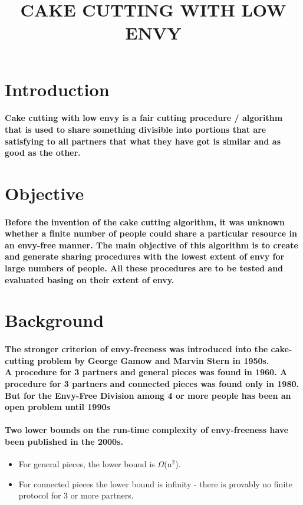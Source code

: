 \documentclass[12pt]{report}
\title{\textbf{CAKE CUTTING WITH LOW ENVY}}
\author{}
\begin{document}
\maketitle

	\section{Introduction} 
	\paragraph{Cake cutting with low envy is a fair cutting procedure / algorithm that is used to share something divisible into portions that are satisfying to all partners that what they have got is similar and as good as the other. }
	
		\section{Objective}
		\paragraph{Before the invention of the cake cutting algorithm, it was unknown whether a finite number of people could share a particular resource in an envy-free manner. The main objective of this algorithm is to create and generate sharing procedures with the lowest extent of envy for large numbers of people. All these procedures are to be tested and evaluated basing on their extent of envy.  }
		
	\section{Background}
	\paragraph{The stronger criterion of envy-freeness was introduced into the cake-cutting problem by George Gamow and Marvin Stern in 1950s.\\
		A procedure for 3 partners and general pieces was found in 1960. A procedure for 3 partners and connected pieces was found only in 1980.\\
		But for the Envy-Free Division among 4 or more people has been an open problem until 1990s}
	\paragraph{Two lower bounds on the run-time complexity of envy-freeness have been published in the 2000s.}
	\begin{itemize}
		\item For general pieces, the lower bound is $\Omega$(n$^{2}$).
		\item For connected pieces the lower bound is infinity - there is provably no finite protocol for 3 or more partners.
	\end{itemize}
\end{document}
